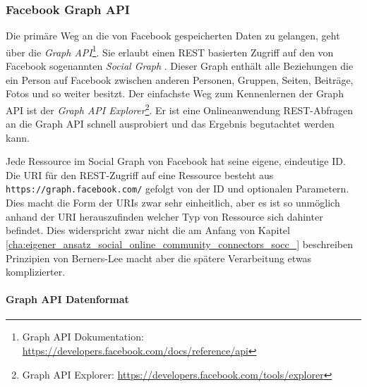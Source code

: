 \subsubsection{Facebook Graph API} %
\label{ssub:facebook_graph_api}

Die primäre Weg an die von Facebook gespeicherten Daten zu gelangen, geht über die \emph{Graph API}\footnote{Graph API Dokumentation:  \url{https://developers.facebook.com/docs/reference/api}}. Sie erlaubt einen REST basierten Zugriff auf den von Facebook sogenannten \emph{Social Graph} \cite{FacebookGraphAPI}. Dieser Graph enthält alle Beziehungen die ein Person auf Facebook zwischen anderen Personen, Gruppen, Seiten, Beiträge, Fotos und so weiter besitzt. Der einfachste Weg zum Kennenlernen der Graph API ist der \emph{Graph API Explorer}\footnote{Graph API Explorer: \url{https://developers.facebook.com/tools/explorer}}. Er ist eine Onlineanwendung REST-Abfragen an die Graph API schnell ausprobiert und das Ergebnis begutachtet werden kann.

Jede Ressource im Social Graph von Facebook hat seine eigene, eindeutige ID. Die URI für den REST-Zugriff auf eine Ressource besteht aus \texttt{https://graph.facebook.com/} gefolgt von der ID und optionalen Parametern. Dies macht die Form der URIs zwar sehr einheitlich, aber es ist so unmöglich anhand der URI herauszufinden welcher Typ von Ressource sich dahinter befindet. Dies widerspricht zwar nicht die am Anfang von Kapitel \ref{cha:eigener_ansatz_social_online_community_connectors_socc_} beschreiben Prinzipien von Berners-Lee macht aber die spätere Verarbeitung etwas komplizierter. 

\paragraph{Graph API Datenformat} %
\label{par:graph_api_datenformat}


